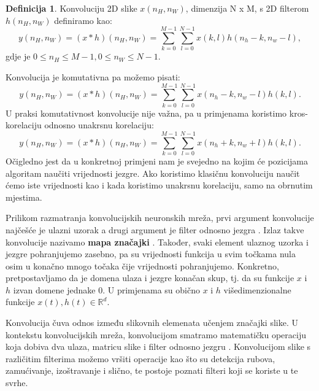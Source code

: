 \documentclass[times, utf8, diplomski]{fer}
\theoremstyle{definition}
\newtheorem{definition}{Definicija}[section]
\begin{document}
\begin{definition}
Konvoluciju 2D slike $x(n_H, n_W)$, dimenzija N x M, s 2D filterom $h(n_H, n_W)$ definiramo kao:
\begin{equation}
y(n_H, n_W) = (x * h) (n_H, n_W) = \sum_{k = 0 }^{M-1}\sum_{l=0}^{N-1}x(k,l)h(n_h-k, n_w-l),
\end{equation}
gdje je $0\le n_H \le M-1, 0\le n_W \le N - 1$.
\end{definition}
Konvolucija je komutativna pa možemo pisati:
\begin{equation}
y(n_H, n_W) = (x * h) (n_H, n_W) = \sum_{k = 0 }^{M-1}\sum_{l=0}^{N-1}x(n_h -k, n_w - l)h(k, l).
\end{equation}
U praksi komutativnost konvolucije nije važna, pa u primjenama koristimo kros-korelaciju  odnosno unakrsnu korelaciju:
\begin{equation}
y(n_H, n_W) = (x * h) (n_H, n_W) = \sum_{k = 0 }^{M-1}\sum_{l=0}^{N-1}x(n_h + k, n_w + l)h(k, l).
\end{equation}
Očigledno jest da u konkretnoj primjeni nam je svejedno na kojim će pozicijama algoritam naučiti vrijednosti jezgre. Ako koristimo klasičnu konvoluciju naučit ćemo iste vrijednosti kao i kada koristimo unakrsnu korelaciju, samo na obrnutim mjestima.

Prilikom razmatranja konvolucijskih neuronskih mreža, prvi argument konvolucije najčešće je ulazni uzorak a drugi argument je filter odnosno jezgra . Izlaz takve konvolucije nazivamo \textbf{mapa značajki} . Također, svaki element ulaznog uzorka i jezgre pohranjujemo zasebno, pa su vrijednosti funkcija u svim točkama nula osim u konačno mnogo točaka čije vrijednosti pohranjujemo. Konkretno, pretpostavljamo da je domena ulaza i jezgre konačan skup, tj. da su funkcije $x$ i $h$ izvan domene jednake 0. U primjenama su obično $x$ i $h$ višedimenzionalne funkcije $x(t), h(t) \in \mathbb{R}^d. $

Konvolucija čuva odnos između slikovnih elemenata učenjem značajki slike. U kontekstu konvolucijskih mreža, konvolucijom smatramo matematičku operaciju koja dobiva dva ulaza, matricu slike i filter odnosno jezgru . Konvolucijom slike s različitim filterima možemo vršiti operacije kao što su detekcija rubova, zamućivanje, izoštravanje i slično, te postoje poznati filteri koji se koriste u te svrhe.
\end{document}
